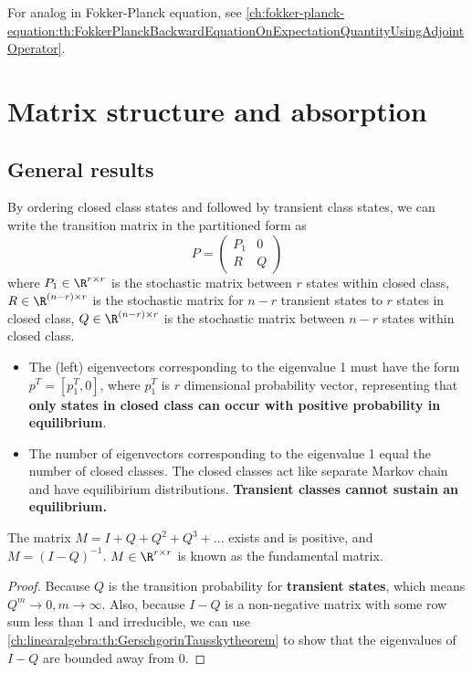 \begin{refsection}
\begin{remark}
For analog in Fokker-Planck equation, see \autoref{ch:fokker-planck-equation:th:FokkerPlanckBackwardEquationOnExpectationQuantityUsingAdjointOperator}. 	
\end{remark}





\section{Matrix structure and absorption}
\subsection{General results}
\begin{definition}\cite[239]{luenberger1979introduction} By ordering closed class states and followed by transient class states, we can write the transition matrix in the partitioned form as
	$$P = \begin{pmatrix}
	P_1 & 0 \\ R & Q
	\end{pmatrix}$$
	where $P_1 \in \R^{r\times r}$ is the stochastic matrix between $r$ states within closed class, $R \in \R^{(n-r)\times r}$ is the stochastic matrix for $n-r$ transient states to $r$ states in closed class, $Q \in \R^{(n-r)\times r}$ is the stochastic matrix between $n-r$ states within closed class.
\end{definition}

\begin{remark}\hfill
	\begin{itemize}
		\item The (left) eigenvectors corresponding to the eigenvalue 1 must have the form $p^T=[p_1^T, 0]$, where $p_1^T$ is $r$ dimensional probability vector, representing that \textbf{only states in closed class can occur with positive probability in equilibrium}. 
		\item The number of eigenvectors corresponding to the eigenvalue 1 equal the number of closed classes. The closed classes act like separate Markov chain and have equilibirium distributions. \textbf{Transient classes cannot sustain an equilibrium.}
	\end{itemize}
\end{remark}

\begin{lemma}
	\cite[240]{luenberger1979introduction} The matrix $M = I + Q +Q^2 + Q^3 + ... $ exists and is positive, and $M = (I-Q)^{-1}$. $M \in \R^{r\times r}$ is known as the fundamental matrix. 
\end{lemma}
\begin{proof}
	Because $Q$ is the transition probability for \textbf{transient states}, which means $Q^m\to 0,m\to \infty$. Also, because $I-Q$ is a non-negative matrix with some row sum less than 1 and irreducible, we can use \autoref{ch:linearalgebra:th:GerschgorinTausskytheorem} to show that the eigenvalues of $I-Q$ are bounded away from 0.
\end{proof}




\end{refsection}
